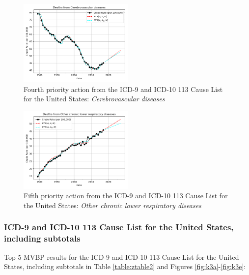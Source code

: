 \documentclass[10pt, a4paper, twocolumn]{IEEEconf}
\begin{document}
\begin{figure}[H]
  \centering
  \includegraphics[width=0.5\textwidth]{results/US_ICD_113_SELECTED_CAUSES_LEAVES/Cerebrovascular_diseases_ets.png}
  \caption{Fourth priority action from the ICD-9 and ICD-10 113 Cause List for the United States: \textit{Cerebrovascular diseases}}\label{fig:k2d}
\end{figure}

\begin{figure}[H]
  \centering
  \includegraphics[width=0.5\textwidth]{results/US_ICD_113_SELECTED_CAUSES_LEAVES/Other_chronic_lower_respiratory_diseases_ets.png}
  \caption{Fifth priority action from the ICD-9 and ICD-10 113 Cause List for the United States: \textit{Other chronic lower respiratory diseases}}\label{fig:k2e}
\end{figure}

\clearpage

\subsubsection{ICD-9 and ICD-10 113 Cause List for the United States, including subtotals}

Top 5 MVBP results for the ICD-9 and ICD-10 113 Cause List for the United States, including subtotals in Table \ref{table:ztable2} and Figures \ref{fig:k3a}-\ref{fig:k3e}:
\end{document}
